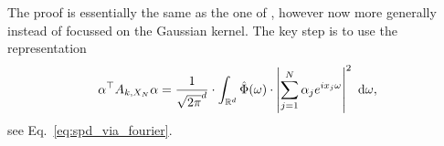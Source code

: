 The proof is essentially the same as the one of ,
however now more generally instead of focussed on the Gaussian kernel.
The key step is to use the representation
\begin{align*}
\alpha^\top A_{k, X_N} \alpha = \frac{1}{\sqrt{2\pi}^d} \cdot \int_{\mathbb{R}^d} \hat{\Phi}(\omega) \cdot \left| \sum_{j=1}^N \alpha_j e^{ix_j \omega} \right|^2 ~ \mathrm{d}\omega,
\end{align*}
see Eq.~\eqref{eq:spd_via_fourier}.





%
%




